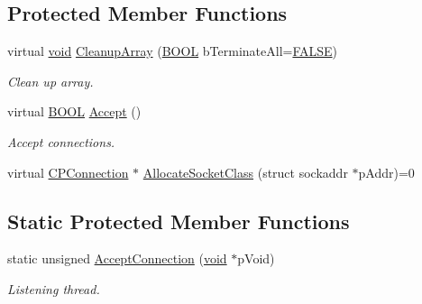 \subsection*{\-Protected \-Member \-Functions}
\begin{DoxyCompactItemize}
\item 
virtual \hyperlink{_cpclient_8h_a6464f7480a0fd0ee170cba12b2c0497f}{void} \hyperlink{class_c_p_server_a09ac2e46ccc306c92b43bd556f682e81}{\-Cleanup\-Array} (\hyperlink{_cpclient_8h_a3be13892ae7076009afcf121347dd319}{\-B\-O\-O\-L} b\-Terminate\-All=\hyperlink{_x_plat_8h_aa93f0eb578d23995850d61f7d61c55c1}{\-F\-A\-L\-S\-E})
\begin{DoxyCompactList}\small\item\em \-Clean up array. \end{DoxyCompactList}\item 
virtual \hyperlink{_cpclient_8h_a3be13892ae7076009afcf121347dd319}{\-B\-O\-O\-L} \hyperlink{class_c_p_server_a1abdbfc0ef46eb052da96829d90a2420}{\-Accept} ()
\begin{DoxyCompactList}\small\item\em \-Accept connections. \end{DoxyCompactList}\item 
virtual \hyperlink{class_c_p_connection}{\-C\-P\-Connection} $\ast$ \hyperlink{class_c_p_server_ab028d102106a438f32c622596eaa1bc0}{\-Allocate\-Socket\-Class} (struct sockaddr $\ast$p\-Addr)=0
\end{DoxyCompactItemize}
\subsection*{\-Static \-Protected \-Member \-Functions}
\begin{DoxyCompactItemize}
\item 
static unsigned \hyperlink{class_c_p_server_a536d91cd5cc25f5bb120345c5ed0cd5b}{\-Accept\-Connection} (\hyperlink{_cpclient_8h_a6464f7480a0fd0ee170cba12b2c0497f}{void} $\ast$p\-Void)
\begin{DoxyCompactList}\small\item\em \-Listening thread. \end{DoxyCompactList}\end{DoxyCompactItemize}
